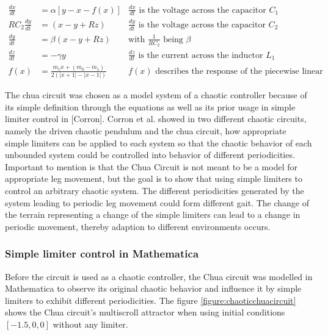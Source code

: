 \documentclass[main]{subfiles}
\begin{document}
\begin{align*}
\frac{dx}{dt}&=\alpha [y-x-f(x)] &\frac{dx}{dt}\text{ is the voltage across the capacitor }C_1\\
RC_2\frac{dy}{dt}&= (x-y+Rz) &\frac{dy}{dt}\text{ is the voltage across the capacitor }C_2\\
\frac{dy}{dt}&=\beta (x-y+Rz) &\text{with } \frac{1}{RC_2} \text{ being }\beta\\
\frac{dz}{dt}&=-\gamma y &\frac{dz}{dt}\text{ is the current across the inductor }L_1\\
f (x) &= \frac{m_1 x + (m_0 - m_1)}{2 (| x + 1 | -| x - 1 |)} &f(x)\text{ describes the response of the piecewise linear resistor}
\end{align*}

\begin{comment}
dx/dt = c1*(y - x - f (x)) // m0 : slope in outer region
    dy/dt = c2*(x - y + z)    // m1 : slope in inner region
    dz/dt = -c3*y         // b : Breakpoints
    f (x) = m1*x + (m0 - m1)/2*(| x + 1 | -| x - 1 |)
\end{comment}

The chua circuit was chosen as a model system of a chaotic controller because of its simple definition through the equations as well as its prior usage in simple limiter control in [Corron]. Corron et al. showed in two different chaotic circuits, namely the driven chaotic pendulum and the chua circuit, how appropriate simple limiters can be applied to each system so that the chaotic behavior of each unbounded system could be controlled into behavior of different periodicities. Important to mention is that the Chua Circuit is not meant to be a model for appropriate leg movement, but the goal is to show that using simple limiters to control an arbitrary chaotic system. The different periodicities generated by the system leading to periodic leg movement could form different gait. The change of the terrain representing a change of the simple limiters can lead to a change in periodic movement, thereby adaption to different environments occurs. 

\subsubsection{Simple limiter control in Mathematica}

Before the circuit is used as a chaotic controller, the Chua circuit was modelled in Mathematica to observe its original chaotic behavior and influence it by simple limiters to exhibit different periodicities. The figure \ref{figure:chaoticchuacircuit} shows the Chua circuit's multiscroll attractor when using initial conditions \([-1.5,0,0]\) without any limiter.
\end{document}
